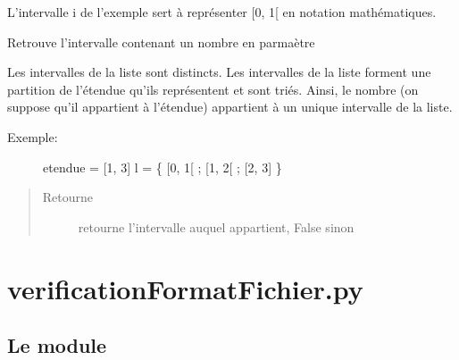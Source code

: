 \documentclass[letterpaper,10pt,openany,oneside,french]{sphinxmanual}
\begin{document}
L’intervalle i de l’exemple sert à représenter {[}0, 1{[} en notation mathématiques.

\begin{fulllineitems}
\label{\detokenize{intervalle:add.intervalle.rechercheIntervalle}}
Retrouve l’intervalle contenant un nombre en parmaètre

Les intervalles de la liste sont distincts.
Les intervalles de la liste forment une partition de l’étendue qu’ils représentent et sont triés.
Ainsi, le nombre (on suppose qu’il appartient à l’étendue) appartient à un unique intervalle de la liste.
\begin{description}
\item[{Exemple:}] \leavevmode
etendue = {[}1, 3{]}
l = \{ {[}0, 1{[} ; {[}1, 2{[} ; {[}2, 3{]} \}

\end{description}
\begin{quote}\begin{description}
\item[{Retourne}] \leavevmode
retourne l’intervalle auquel  appartient, False sinon

\end{description}\end{quote}

\end{fulllineitems}



\chapter{verificationFormatFichier.py}
\label{\detokenize{verificationFormatFichier::doc}}\label{\detokenize{verificationFormatFichier:module-chargement_des_donnees.verificationFormatFichier}}\label{\detokenize{verificationFormatFichier:verificationformatfichier-py}}

\section{Le module }
\label{\detokenize{verificationFormatFichier:le-module-verification-format-fichier}}
\end{document}
